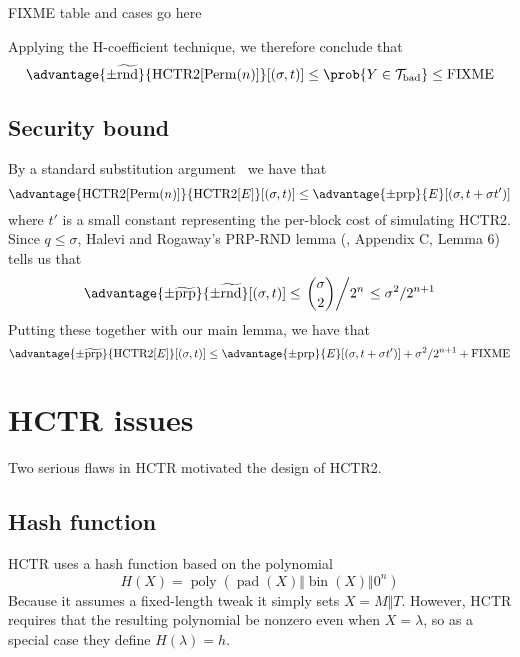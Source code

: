 \documentclass[letterpaper,11pt]{article}
\newcommand*{\Concat}{\Vert}
\newcommand*{\Tb}{\mathcal{T}_\mathrm{bad}}
\DeclareMathOperator{\fromint}{bin}
\DeclareMathOperator{\HCTR}{HCTR2}
\DeclareMathOperator{\pad}{pad}
\DeclareMathOperator{\Perm}{Perm}
\DeclareMathOperator{\poly}{poly}
\begin{document}
FIXME table and cases go here

Applying the H-coefficient technique, we therefore conclude that
\begin{displaymath}
    \advantage{\pm\widetilde{\mathrm{rnd}}}{\HCTR[\Perm(n)]}[(\sigma, t)] \leq
    \prob{Y \in \Tb} \leq \mathrm{FIXME}
\end{displaymath}

\subsection{Security bound}
By a standard substitution argument~\cite{cbcsec,concrete} we have that
\begin{displaymath}
    \advantage{\HCTR[\Perm(n)]}{\HCTR[E]}[(\sigma, t)]
    \leq \advantage{\pm \mathrm{prp}}{E}[(\sigma, t + \sigma t')]
\end{displaymath}
where \(t'\) is a small constant
representing the per-block cost of simulating HCTR2.
Since \(q \leq \sigma\), Halevi and Rogaway's PRP-RND lemma
(\cite{cmc}, Appendix C, Lemma 6) tells us that
\begin{displaymath}
    \advantage{\pm \widetilde{\mathrm{prp}}}{\pm\widetilde{\mathrm{rnd}}}[(\sigma, t)] 
    \leq \left.\binom{\sigma}{2}\middle/2^n\right.
    \leq \sigma^2/2^{n+1}
\end{displaymath}
Putting these together with our main lemma, we have that
\begin{displaymath}
    \advantage{\pm \widetilde{\mathrm{prp}}}{\HCTR[E]}[(\sigma, t)] \leq \advantage{\pm \mathrm{prp}}{E}[(\sigma, t + \sigma t')]
    + \sigma^2/2^{n+1}
    + \mathrm{FIXME}
\end{displaymath}

\section{HCTR issues}\label{hctrflaws}
Two serious flaws in HCTR motivated the design of HCTR2.
\subsection{Hash function}
HCTR uses a hash function based on the polynomial
\begin{displaymath}
    H(X) = \poly(\pad(X) \Concat \fromint(X) \Concat 0^n)
\end{displaymath}
Because it assumes a fixed-length tweak it simply sets \(X = M \Concat T\).
However, HCTR requires that the resulting polynomial be nonzero
even when \(X = \lambda\), so as a special case they define
\(H(\lambda) = h\).
\end{document}
